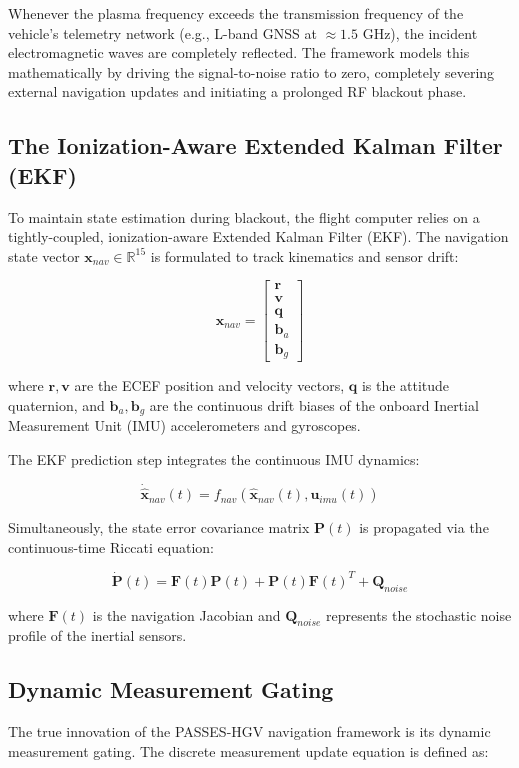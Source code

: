 \documentclass[11pt,a4paper]{article}
\theoremstyle{definition}
\numberwithin{equation}{section}
\newcommand{\R}{\mathbb{R}}
\begin{document}
Whenever the plasma frequency exceeds the transmission frequency of the vehicle's telemetry network (e.g., L-band GNSS at $\approx 1.5$ GHz), the incident electromagnetic waves are completely reflected. The framework models this mathematically by driving the signal-to-noise ratio to zero, completely severing external navigation updates and initiating a prolonged RF blackout phase.

\subsection{The Ionization-Aware Extended Kalman Filter (EKF)}
To maintain state estimation during blackout, the flight computer relies on a tightly-coupled, ionization-aware Extended Kalman Filter (EKF). The navigation state vector $\mathbf{x}_{nav} \in \R^{15}$ is formulated to track kinematics and sensor drift:

$$\mathbf{x}_{nav} = \begin{bmatrix} \mathbf{r} \\ \mathbf{v} \\ \mathbf{q} \\ \mathbf{b}_a \\ \mathbf{b}_g \end{bmatrix}$$

where $\mathbf{r}, \mathbf{v}$ are the ECEF position and velocity vectors, $\mathbf{q}$ is the attitude quaternion, and $\mathbf{b}_a, \mathbf{b}_g$ are the continuous drift biases of the onboard Inertial Measurement Unit (IMU) accelerometers and gyroscopes.

The EKF prediction step integrates the continuous IMU dynamics:

$$\dot{\hat{\mathbf{x}}}_{nav}(t) = f_{nav}(\hat{\mathbf{x}}_{nav}(t), \mathbf{u}_{imu}(t))$$

Simultaneously, the state error covariance matrix $\mathbf{P}(t)$ is propagated via the continuous-time Riccati equation:

$$\dot{\mathbf{P}}(t) = \mathbf{F}(t) \mathbf{P}(t) + \mathbf{P}(t) \mathbf{F}(t)^T + \mathbf{Q}_{noise}$$

where $\mathbf{F}(t)$ is the navigation Jacobian and $\mathbf{Q}_{noise}$ represents the stochastic noise profile of the inertial sensors.

\subsection{Dynamic Measurement Gating}
The true innovation of the PASSES-HGV navigation framework is its dynamic measurement gating. The discrete measurement update equation is defined as:
\end{document}
